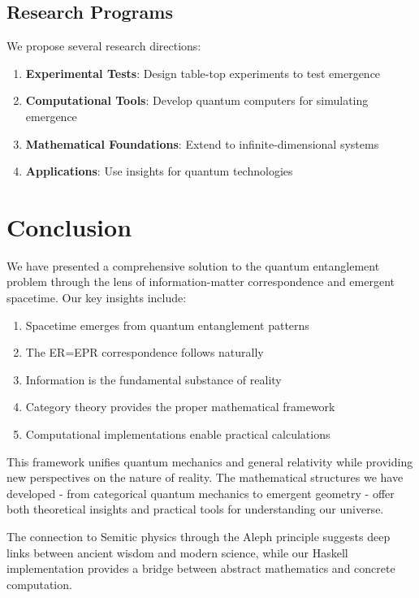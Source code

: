\documentclass[12pt,a4paper]{article}
\theoremstyle{plain}
\theoremstyle{definition}
\theoremstyle{remark}
\begin{document}
\subsection{Research Programs}

We propose several research directions:

\begin{enumerate}
\item \textbf{Experimental Tests}: Design table-top experiments to test emergence
\item \textbf{Computational Tools}: Develop quantum computers for simulating emergence
\item \textbf{Mathematical Foundations}: Extend to infinite-dimensional systems
\item \textbf{Applications}: Use insights for quantum technologies
\end{enumerate}

\section{Conclusion}

We have presented a comprehensive solution to the quantum entanglement problem through the lens of information-matter correspondence and emergent spacetime. Our key insights include:

\begin{enumerate}
\item Spacetime emerges from quantum entanglement patterns
\item The ER=EPR correspondence follows naturally
\item Information is the fundamental substance of reality
\item Category theory provides the proper mathematical framework
\item Computational implementations enable practical calculations
\end{enumerate}

This framework unifies quantum mechanics and general relativity while providing new perspectives on the nature of reality. The mathematical structures we have developed - from categorical quantum mechanics to emergent geometry - offer both theoretical insights and practical tools for understanding our universe.

The connection to Semitic physics through the Aleph principle suggests deep links between ancient wisdom and modern science, while our Haskell implementation provides a bridge between abstract mathematics and concrete computation.
\end{document}
